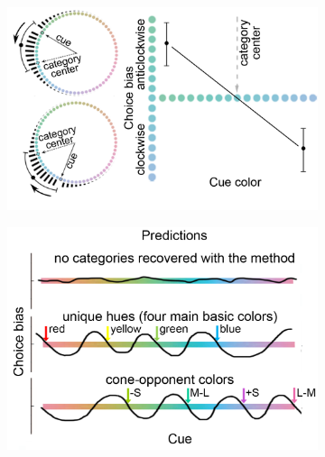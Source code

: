 \begin{figure}
    \begin{subfigure}[t]{0.45\textwidth}
         \centering
         \caption{}
        \includegraphics[width=\textwidth]{../Figures/working/F1_ParadigmPredictions/c.png}
         \label{fig:Bias1}
    \end{subfigure}
    \hfill
    \begin{subfigure}[t]{0.45\textwidth}
         \centering
         \caption{}
        \includegraphics[width=\textwidth]{../Figures/working/F1_ParadigmPredictions/d.png}
         \label{fig:BiasPredictions}
    \end{subfigure}


\end{figure}

